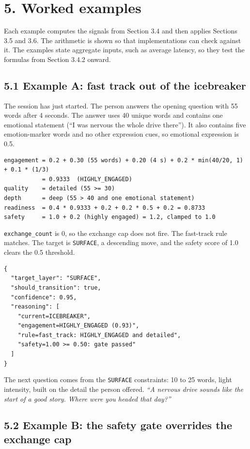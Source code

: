 \documentclass[11pt]{article}
\begin{document}
\section{5. Worked examples}

Each example computes the signals from Section 3.4 and then applies
Sections 3.5 and 3.6. The arithmetic is shown so that implementations
can check against it. The examples state aggregate inputs, such as
average latency, so they test the formulas from Section 3.4.2 onward.

\subsection{5.1 Example A: fast track out of the icebreaker}

The session has just started. The person answers the opening question
with 55 words after 4 seconds. The answer uses 40 unique words and
contains one emotional statement (``I was nervous the whole drive
there''). It also contains five emotion-marker words and no other
expression cues, so emotional expression is 0.5.

\begin{verbatim}
engagement = 0.2 + 0.30 (55 words) + 0.20 (4 s) + 0.2 * min(40/20, 1) + 0.1 * (1/3)
           = 0.9333  (HIGHLY_ENGAGED)
quality    = detailed (55 >= 30)
depth      = deep (55 > 40 and one emotional statement)
readiness  = 0.4 * 0.9333 + 0.2 + 0.2 * 0.5 + 0.2 = 0.8733
safety     = 1.0 + 0.2 (highly engaged) = 1.2, clamped to 1.0
\end{verbatim}

\texttt{exchange\_\allowbreak{}count} is 0, so the exchange cap does not fire. The
fast-track rule matches. The target is \texttt{SURFACE}, a descending
move, and the safety score of 1.0 clears the 0.5 threshold.

\begin{verbatim}
{
  "target_layer": "SURFACE",
  "should_transition": true,
  "confidence": 0.95,
  "reasoning": [
    "current=ICEBREAKER",
    "engagement=HIGHLY_ENGAGED (0.93)",
    "rule=fast_track: HIGHLY_ENGAGED and detailed",
    "safety=1.00 >= 0.50: gate passed"
  ]
}
\end{verbatim}

The next question comes from the \texttt{SURFACE} constraints: 10 to 25
words, light intensity, built on the detail the person offered.
\emph{``A nervous drive sounds like the start of a good story. Where
were you headed that day?''}

\subsection{5.2 Example B: the safety gate overrides the exchange cap}
\end{document}
